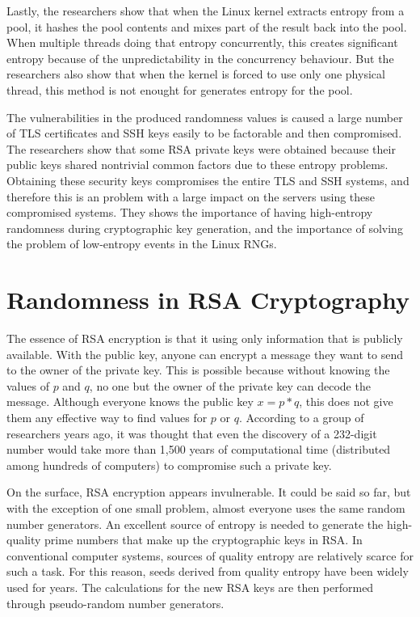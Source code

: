\documentclass[graybox]{svmult}
\begin{document}
Lastly, the researchers show that when the Linux kernel extracts entropy from a pool, it hashes the pool contents and mixes part of the result back into the pool. When multiple threads doing that entropy concurrently, this creates significant entropy because of the unpredictability in the concurrency behaviour. But the researchers also show that when the kernel is forced to use only one physical thread, this method is not enought for generates entropy for the pool.

The vulnerabilities in the produced randomness values is caused a large number of TLS certificates and SSH keys easily to be factorable and then compromised. The researchers show that some RSA private keys were obtained because their public keys shared nontrivial common factors due to these entropy problems. Obtaining these security keys compromises the entire TLS and SSH systems, and therefore this is an problem with a large impact on the servers using these compromised systems. They shows the importance of having high-entropy randomness during cryptographic key generation, and the importance of solving the problem of low-entropy events in the Linux RNGs.

\section{Randomness in RSA Cryptography}
\label{sec:3}

The essence of RSA encryption is that it using only information that is publicly available. With the public key, anyone can encrypt a message they want to send to the owner of the private key. This is possible because without knowing the values of $p$ and $q$, no one but the owner of the private key can decode the message. Although everyone knows the public key $x = p * q$, this does not give them any effective way to find values for $p$ or $q$. According to a group of researchers years ago, it was thought that even the discovery of a 232-digit number would take more than 1,500 years of computational time (distributed among hundreds of computers) to compromise such a private key. 

On the surface, RSA encryption appears invulnerable. It could be said so far, but with the exception of one small problem, almost everyone uses the same random number generators. An excellent source of entropy is needed to generate the high-quality prime numbers that make up the cryptographic keys in RSA. In conventional computer systems, sources of quality entropy are relatively scarce for such a task. For this reason, seeds derived from quality entropy have been widely used for years. The calculations for the new RSA keys are then performed through pseudo-random number generators. 
\end{document}
